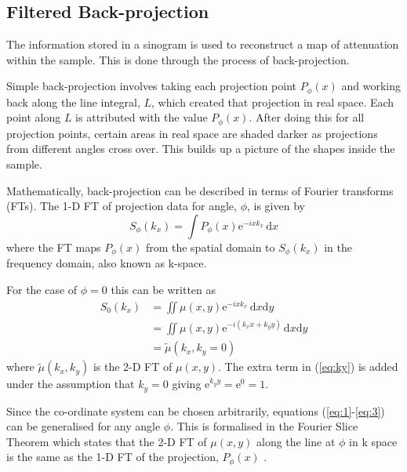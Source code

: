 	
	
	
	
	
	
	\subsection{Filtered Back-projection}
	\label{subsec:FBP}
	
	The information stored in a sinogram is used to reconstruct a map of attenuation within the sample. This is done through the process of back-projection.
	
	Simple back-projection involves  taking each projection point $P_{\phi}(x)$ and working back along the line integral, $L$, which created that projection in real space. Each point along $L$ is  attributed with the value $P_{\phi}(x)$. After doing this for all projection points, certain areas in real space are shaded darker as projections from different angles cross over. This builds up a picture of the shapes inside the sample. 
	
	Mathematically, back-projection can be described in terms of Fourier transforms (FTs). The 1-D FT of projection data for  angle, $\phi$, is given by
	\begin{equation}
	S_{\phi}(k_x) = \int P_{\phi}(x)\mathrm{e}^{-i x k_x}\, \mathrm{d}x
	\end{equation}
	where the FT maps $P_{\phi}(x)$ from the spatial domain to $S_{\phi}(k_x)$ in the frequency domain, also known as k-space.
	
	For the case of $\phi = 0$ this can  be written as
	\begin{align}
	S_{0}(k_x) &= \iint \mu(x,y) \mathrm{e}^{-i x k_x }\, \mathrm{d}x\mathrm{d}y \label{eq:1}\\
	&= \iint \mu(x,y) \mathrm{e}^{-i(k_xx +k_yy)}\, \mathrm{d}x\mathrm{d}y \label{eq:ky} \\ 
	&= \tilde{\mu}(k_x,k_y=0) \label{eq:3}
	\end{align}
	where $\tilde{\mu}(k_x,k_y)$ is the 2-D FT of $\mu(x,y)$.
	The extra term in (\ref{eq:ky}) is added  under the assumption that $k_y = 0$ giving $\mathrm{e}^{k_yy}=\mathrm{e}^{0}=1$. 
	
	Since the co-ordinate system can be chosen arbitrarily, equations (\ref{eq:1}-\ref{eq:3}) can be generalised for any angle $\phi$.
	This  is formalised in the Fourier Slice Theorem which states that the 2-D FT of $\mu(x,y)$ along the line at $\phi$ in k space is the same as the 1-D FT of the projection, $P_{\phi}(x)$ \cite{Doran:2008kh}.
	
